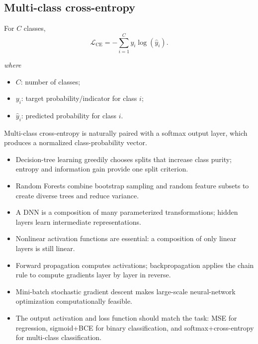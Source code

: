 \documentclass[11pt,a4paper]{report}
\newcommand{\chapterprefix}{Lecture}
\newcommand{\wherelegend}{\par\smallskip\textit{where}\vspace{-0.3em}}
\begin{document}
\subsection{Multi-class cross-entropy}

For $C$ classes,
\begin{equation}
  \mathcal{L}_{\mathrm{CE}}=-\sum_{i=1}^{C} y_i\log(\hat y_i).
  \label{eq:cross-entropy}
\end{equation}
\wherelegend
\begin{itemize}
  \item $C$: number of classes;
  \item $y_i$: target probability/indicator for class $i$;
  \item $\hat y_i$: predicted probability for class $i$.
\end{itemize}
Multi-class cross-entropy is naturally paired with a softmax output layer, which produces a normalized class-probability vector.

\begin{takeawaybox}
\begin{itemize}
  \item Decision-tree learning greedily chooses splits that increase class purity; entropy and information gain provide one split criterion.
  \item Random Forests combine bootstrap sampling and random feature subsets to create diverse trees and reduce variance.
  \item A DNN is a composition of many parameterized transformations; hidden layers learn intermediate representations.
  \item Nonlinear activation functions are essential: a composition of only linear layers is still linear.
  \item Forward propagation computes activations; backpropagation applies the chain rule to compute gradients layer by layer in reverse.
  \item Mini-batch stochastic gradient descent makes large-scale neural-network optimization computationally feasible.
  \item The output activation and loss function should match the task: MSE for regression, sigmoid+BCE for binary classification, and softmax+cross-entropy for multi-class classification.
\end{itemize}
\end{takeawaybox}

\appendix
\renewcommand{\chapterprefix}{Appendix}
\end{document}
